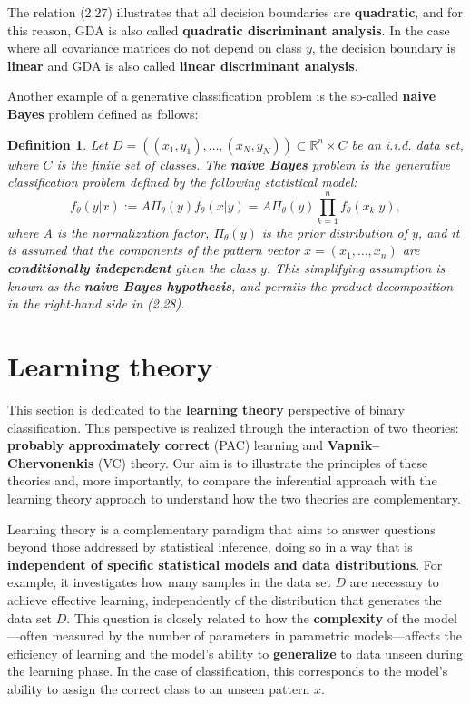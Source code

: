\documentclass{report}
\newtheorem{definition}{Definition}[chapter]
\begin{document}
The relation (2.27) illustrates that all decision boundaries are \textbf{quadratic}, and for this reason, GDA is also called \textbf{quadratic discriminant analysis}. In the case where all covariance matrices do not depend on class $y$, the decision boundary is \textbf{linear} and GDA is also called \textbf{linear discriminant analysis}.

Another example of a generative classification problem is the so-called \textbf{naive Bayes} problem defined as follows:

\begin{definition}
Let $D = ((x_1,y_1),\dots,(x_N,y_N)) \subset \mathbb{R}^n\times C$ be an i.i.d. data set, where $C$ is the finite set of classes. The \textbf{naive Bayes} problem is the generative classification problem defined by the following statistical model:
\begin{equation}
f_\theta(y|x) := A\Pi_\theta(y)f_\theta(x|y) = A \Pi_\theta(y)\prod_{k=1}^nf_\theta(x_k|y),
\end{equation}
where A is the normalization factor, $\Pi_\theta(y)$ is the prior distribution of $y$, and it is assumed that the components of the pattern vector $x = (x_1,\dots,x_n)$ are \textbf{conditionally independent} given the class $y$. This simplifying assumption is known as the \textbf{naive Bayes hypothesis}, and permits the product decomposition in the right-hand side in (2.28).
\end{definition}

\section{Learning theory}
This section is dedicated to the \textbf{learning theory} perspective of binary classification. This perspective is realized through the interaction of two theories: \textbf{probably approximately correct} (PAC) learning and \textbf{Vapnik–Chervonenkis} (VC) theory. Our aim is to illustrate the principles of these theories and, more importantly, to compare the inferential approach with the learning theory approach to understand how the two theories are complementary.

Learning theory is a complementary paradigm that aims to answer questions beyond those addressed by statistical inference, doing so in a way that is \textbf{independent of specific statistical models and data distributions}. For example, it investigates how many samples in the data set $D$ are necessary to achieve effective learning, independently of the distribution that generates the data set $D$. This question is closely related to how the \textbf{complexity} of the model—often measured by the number of parameters in parametric models—affects the efficiency of learning and the model’s ability to \textbf{generalize} to data unseen during the learning phase. In the case of classification, this corresponds to the model’s ability to assign the correct class to an unseen pattern $x$.
\end{document}

